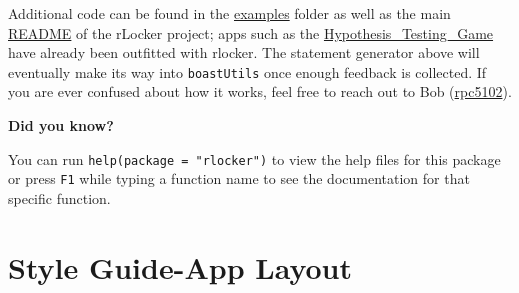 \documentclass[
]{book}
\newenvironment{Shaded}{\begin{snugshade}}{\end{snugshade}}
\newcommand{\CommentTok}[1]{\textcolor[rgb]{0.56,0.35,0.01}{\textit{#1}}}
\newcommand{\DataTypeTok}[1]{\textcolor[rgb]{0.13,0.29,0.53}{#1}}
\newcommand{\KeywordTok}[1]{\textcolor[rgb]{0.13,0.29,0.53}{\textbf{#1}}}
\newcommand{\NormalTok}[1]{#1}
\newcommand{\OperatorTok}[1]{\textcolor[rgb]{0.81,0.36,0.00}{\textbf{#1}}}
\newcommand{\OtherTok}[1]{\textcolor[rgb]{0.56,0.35,0.01}{#1}}
\newcommand{\RegionMarkerTok}[1]{#1}
\newcommand{\StringTok}[1]{\textcolor[rgb]{0.31,0.60,0.02}{#1}}
\begin{document}
\begin{Shaded}
\end{Shaded}

Additional code can be found in the \href{https://github.com/rpc5102/rlocker/tree/master/inst/examples}{examples} folder as well as the main \href{https://github.com/rpc5102/rlocker/blob/master/README.md}{README} of the rLocker project; apps such as the \href{https://github.com/EducationShinyAppTeam/Hypothesis_Testing_Game}{Hypothesis\_Testing\_Game} have already been outfitted with rlocker. The statement generator above will eventually make its way into \texttt{boastUtils} once enough feedback is collected. If you are ever confused about how it works, feel free to reach out to Bob (\href{mailto:rpc5102@psu.edu}{rpc5102}).

\textbf{Did you know?}

You can run \texttt{help(package\ =\ "rlocker")} to view the help files for this package or press \texttt{F1} while typing a function name to see the documentation for that specific function.

\hypertarget{part-style-guide-app-layout}{%
\part{Style Guide-App Layout}\label{part-style-guide-app-layout}}
\end{document}
